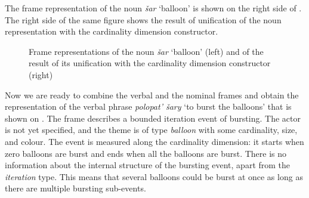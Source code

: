 The frame representation of the noun \textit{\v{s}ar} `balloon' is shown on the right side of . The right side of the same figure shows the result of unification of the noun representation with the cardinality dimension constructor.

\begin{figure}
\hfill%
\caption{Frame representations of the noun  \textit{\v{s}ar} `balloon' (left) and of the result of its unification with the cardinality dimension constructor (right) \label{frame:balloon}}
\end{figure}

Now we are ready to combine the verbal and the nominal frames and obtain the representation of the verbal phrase \textit{polopat' \v{s}ary} `to burst the balloons' that is shown on . The frame describes a bounded iteration event of bursting. The actor is not yet specified, and the theme is of type \textit{balloon} with some cardinality, size, and colour. The event is measured along the cardinality dimension: it starts when zero balloons are burst and ends when all the balloons are burst. There is no information about the internal structure of the bursting event, apart from the \textit{iteration} type. This means that several balloons could be burst at once as long as there are multiple bursting sub-events.

